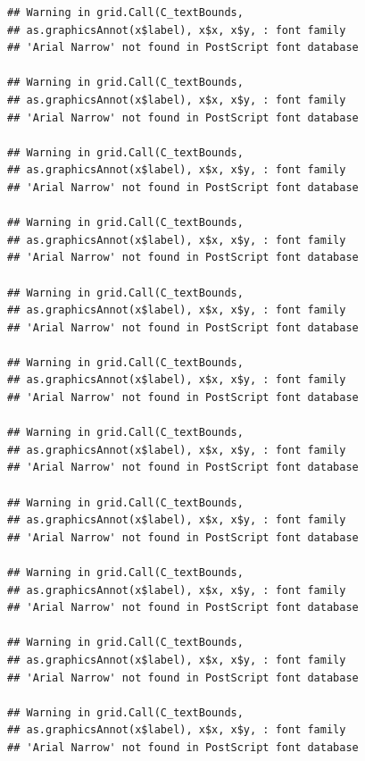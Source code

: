 \documentclass[]{krantz}
\begin{document}
\begin{verbatim}
## Warning in grid.Call(C_textBounds,
## as.graphicsAnnot(x$label), x$x, x$y, : font family
## 'Arial Narrow' not found in PostScript font database

## Warning in grid.Call(C_textBounds,
## as.graphicsAnnot(x$label), x$x, x$y, : font family
## 'Arial Narrow' not found in PostScript font database

## Warning in grid.Call(C_textBounds,
## as.graphicsAnnot(x$label), x$x, x$y, : font family
## 'Arial Narrow' not found in PostScript font database

## Warning in grid.Call(C_textBounds,
## as.graphicsAnnot(x$label), x$x, x$y, : font family
## 'Arial Narrow' not found in PostScript font database

## Warning in grid.Call(C_textBounds,
## as.graphicsAnnot(x$label), x$x, x$y, : font family
## 'Arial Narrow' not found in PostScript font database

## Warning in grid.Call(C_textBounds,
## as.graphicsAnnot(x$label), x$x, x$y, : font family
## 'Arial Narrow' not found in PostScript font database

## Warning in grid.Call(C_textBounds,
## as.graphicsAnnot(x$label), x$x, x$y, : font family
## 'Arial Narrow' not found in PostScript font database

## Warning in grid.Call(C_textBounds,
## as.graphicsAnnot(x$label), x$x, x$y, : font family
## 'Arial Narrow' not found in PostScript font database

## Warning in grid.Call(C_textBounds,
## as.graphicsAnnot(x$label), x$x, x$y, : font family
## 'Arial Narrow' not found in PostScript font database

## Warning in grid.Call(C_textBounds,
## as.graphicsAnnot(x$label), x$x, x$y, : font family
## 'Arial Narrow' not found in PostScript font database

## Warning in grid.Call(C_textBounds,
## as.graphicsAnnot(x$label), x$x, x$y, : font family
## 'Arial Narrow' not found in PostScript font database
\end{verbatim}
\end{document}
